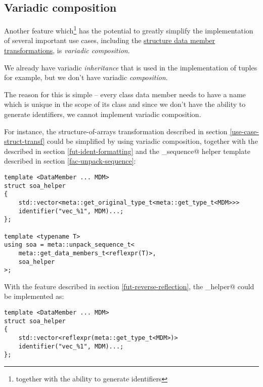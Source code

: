 \subsection{Variadic composition}
\label{fut-variadic-composition}

Another feature which\footnote{together with the ability to generate identifiers}
has the potential to greatly simplify the implementation of several important
use cases, including the \hyperref[use-case-struct-transf]{structure data
member transformations}, is {\em variadic composition}.

We already have variadic {\em inheritance} that is used in the implementation
of tuples for example, but we don't have variadic {\em composition}.

The reason for this is simple -- every class data member needs to have a name
which is unique in the scope of its class and since we don't have the ability
to generate identifiers, we cannot implement variadic composition.

For instance, the structure-of-arrays transformation described in section
\ref{use-case-struct-transf} could be simplified by using variadic composition,
together with the  described in section
\ref{fut-ident-formatting} and the \verb@unpack_sequence@ helper template
described in section \ref{fac-unpack-sequence}:

\begin{verbatim}
template <DataMember ... MDM>
struct soa_helper
{
	std::vector<meta::get_original_type_t<meta::get_type_t<MDM>>>
	identifier("vec_%1", MDM)...;
};

template <typename T>
using soa = meta::unpack_sequence_t<
	meta::get_data_members_t<reflexpr(T)>,
	soa_helper
>;
\end{verbatim}

With the  feature described in section
\ref{fut-reverse-reflection}, the \verb@soa_helper@ could be implemented as:

\begin{verbatim}
template <DataMember ... MDM>
struct soa_helper
{
	std::vector<reflexpr(meta::get_type_t<MDM>)>
	identifier("vec_%1", MDM)...;
};
\end{verbatim}
